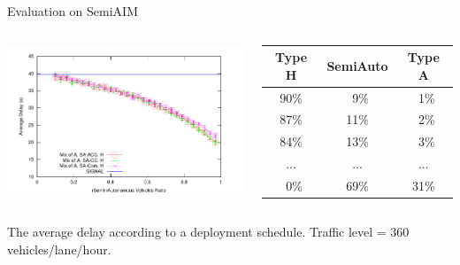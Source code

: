 \documentclass{beamer}
\begin{document}
\begin{frame}{Evaluation on SemiAIM}
\begin{columns}[c]
	\includegraphics[width=\columnwidth]{figures/figure_4.pdf}

	\small
	\begin{tabular}{|c|c|c|}
    \hline
    Type H&  SemiAuto &    Type A\\
    \hline
    90\% &      \ 9\% &   \ 1\% \\
    \hline
    87\% &     11\% &    \ 2\% \\
    \hline
    84\% &     13\% &    \ 3\% \\
    \hline
     ...&   ...&   ...\\
    \hline
    \ 0\%&     69\% &  31\% \\
    \hline
	\end{tabular}

\end{columns}

\hfill

The average delay according to a deployment schedule. Traffic level =
360 vehicles/lane/hour.
\end{frame}
\end{document}

